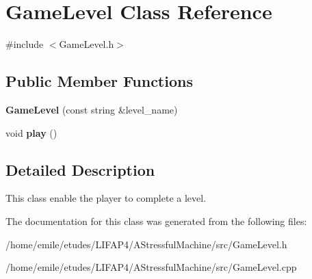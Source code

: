 \hypertarget{classGameLevel}{}\section{Game\+Level Class Reference}
\label{classGameLevel}


{\ttfamily \#include $<$Game\+Level.\+h$>$}

\subsection*{Public Member Functions}
\begin{DoxyCompactItemize}
\item 
\mbox{\label{classGameLevel_ac990c08a5a5b4956537f88d4fdec23eb}} 
{\bfseries Game\+Level} (const string \&level\+\_\+name)
\item 
\mbox{\label{classGameLevel_a3bfcb4fcadf0eb8918f7b9e956d29d68}} 
void {\bfseries play} ()
\end{DoxyCompactItemize}


\subsection{Detailed Description}
This class enable the player to complete a level. 

The documentation for this class was generated from the following files\+:\begin{DoxyCompactItemize}
\item 
/home/emile/etudes/\+L\+I\+F\+A\+P4/\+A\+Stressful\+Machine/src/Game\+Level.\+h\item 
/home/emile/etudes/\+L\+I\+F\+A\+P4/\+A\+Stressful\+Machine/src/Game\+Level.\+cpp\end{DoxyCompactItemize}
